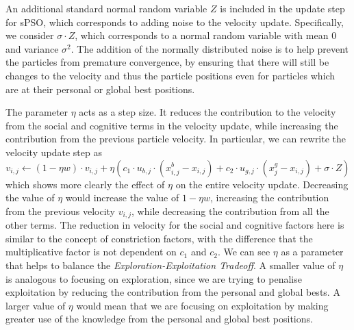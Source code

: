 \documentclass[12pt]{article}
\theoremstyle{definition}
\begin{document}
An additional standard normal random variable $Z$ is included in the update step for sPSO, which corresponds to adding noise to the velocity update. Specifically, we consider $\sigma \cdot Z$, which corresponds to a normal random variable with mean $0$ and variance $\sigma^2$. The addition of the normally distributed noise is to help prevent the particles from premature convergence, by ensuring that there will still be changes to the velocity and thus the particle positions even for particles which are at their personal or global best positions. \newline

The parameter $\eta$ acts as a step size. It reduces the contribution to the velocity from the social and cognitive terms in the velocity update, while increasing the contribution from the previous particle velocity. In particular, we can rewrite the velocity update step as
$$v_{i,j} \leftarrow  (1 - \eta w) \cdot v_{i,j} +  \eta \left( c_1 \cdot u_{b,j} \cdot  (x^b_{i,j} - x_{i,j}) + c_2 \cdot u_{g,j} \cdot (x^g_j - x_{i,j}) + \sigma \cdot Z \right)$$
which shows more clearly the effect of $\eta$ on the entire velocity update. Decreasing the value of $\eta$ would increase the value of $1 - \eta w$, increasing the contribution from the previous velocity $v_{i,j}$, while decreasing the contribution from all the other terms. The reduction in velocity for the social and cognitive factors here is similar to the concept of constriction factors, with the difference that the multiplicative factor is not dependent on $c_1$ and $c_2$. We can see $\eta$ as a parameter that helps to balance the \textit{Exploration-Exploitation Tradeoff}. A smaller value of $\eta$ is analogous to focusing on exploration, since we are trying to penalise exploitation by reducing the contribution from the personal and global bests. A larger value of $\eta$ would mean that we are focusing on exploitation by making greater use of the knowledge from the personal and global best positions.

\end{document}
